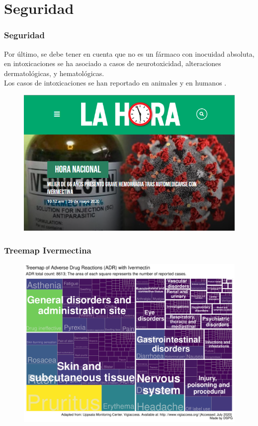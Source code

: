 \documentclass[12pt,xcolor=dvipsnames]{beamer}
\begin{document}
	\section{Seguridad}
	\begin{frame}
		\frametitle{Seguridad}
		\begin{multicols}{2}
			\footnotesize Por último, se debe tener en cuenta que no es un fármaco con inocuidad absoluta, en intoxicaciones se ha asociado a casos de neurotoxicidad, alteraciones dermatológicas, y hematológicas. \\
			\vspace{2em}
			Los casos de intoxicaciones se han reportado en animales \cite{Swor2009,Saqib2015,Sidhu2019} y en humanos \cite{Soyuncu2007,Chandler2018}. 
			
			\columnbreak			
			\begin{figure}
				\centering
				\includegraphics[width=1.0\linewidth]{figs/ivm_intoxicacion}
				\label{fig:ivmintoxicacion}
			\end{figure}
		\end{multicols}	
	\end{frame}
	
	\begin{frame}
		\frametitle[Mapa IVM]{Treemap Ivermectina}
		\begin{figure}[t]
			\centering
			\includegraphics[width=0.8\linewidth]{../seguridad_IVM/Heat_Map_IVM}
			\label{fig:heatmapivm}
		\end{figure}
	\end{frame}
\end{document}
